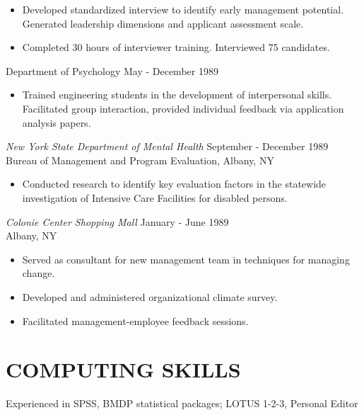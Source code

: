 \documentclass{res}
\begin{document}
\begin{resume}
 \begin{itemize} \itemsep -2pt
  \item  Developed standardized interview to identify early management 
    potential.  Generated  leadership  dimensions  and  applicant 
    assessment scale. 
  \item  Completed 30 hours of interviewer  training.  Interviewed  75 
 candidates. 
\end{itemize} \vspace{-6pt}
 
Department of Psychology       \hfill               May - December 1989 
 \begin{itemize} 
 \item  Trained  engineering   students   in   the   development   of 
    interpersonal skills. Facilitated group interaction, provided 
    individual feedback via application analysis papers. 
 \end{itemize}
 
{\sl New York State Department of Mental Health} \hfill  September - December 
1989 \\
Bureau of Management and Program Evaluation, Albany, NY 
  \begin{itemize}
  \item  Conducted  research to identify key evaluation factors in the 
    statewide investigation  of  Intensive  Care  Facilities  for 
    disabled persons. 
 \end{itemize}

\newpage

{\sl Colonie Center Shopping Mall} \hfill                  January - June 1989 \\
Albany, NY 
  \begin{itemize}
  \item Served  as  consultant  for new management team in techniques 
    for managing change. 
 \item  Developed and administered organizational climate survey. 
 \item  Facilitated management-employee feedback sessions. 
 \end{itemize}

\vspace{0.2in} 
\section{COMPUTING SKILLS}
\vspace{8pt} 
Experienced in SPSS,  BMDP  statistical  packages;  LOTUS  1-2-3, 
Personal Editor 
 

\end{resume}
\end{document}
